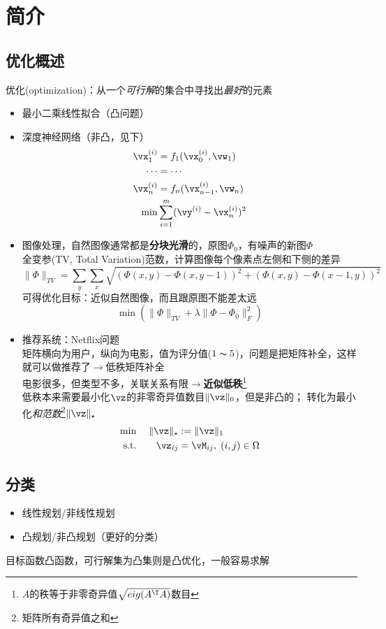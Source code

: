 
\section{简介} %
\subsection{优化概述}
优化(optimization)：从一个\emph{可行解}的集合中寻找出\emph{最好}的元素
\begin{example}
\begin{itemize}
\item 最小二乘线性拟合（凸问题）
\item 深度神经网络（非凸，见下）
\[\begin{aligned}
\vx_1^{(i)}&=f_1(\vx_0^{(i)},\vw_1)\\
\cdots&=\cdots\\
\vx_n^{(i)}&=f_n(\vx_{n-1}^{(i)},\vw_n)\\
\min&\sum_{i=1}^m(\vy^{(i)}-\vx_n^{(i)})^2
\end{aligned}\]
\item 图像处理，自然图像通常都是\textbf{分块光滑}的，原图$\Phi_0$，有噪声的新图$\Phi$\\
全变参(TV, Total Variation)范数，计算图像每个像素点左侧和下侧的差异
\[\|\Phi\|_{TV}=\sum_y\sum_x\sqrt{(\Phi(x,y)-\Phi(x,y-1))^2+(\Phi(x,y)-\Phi(x-1,y))^2}\]
可得优化目标：近似自然图像，而且跟原图不能差太远
\[\min(\|\Phi\|_{TV}+\lambda\|\Phi-\Phi_0\|_F^2)\]
\item 推荐系统：Netflix问题\\
矩阵横向为用户，纵向为电影，值为评分值($1\thicksim 5$)，问题是把矩阵补全，这样就可以做推荐了$\to$低秩矩阵补全\\
电影很多，但类型不多，关联关系有限$\to$\textbf{近似低秩}\footnote{$A$的秩等于非零奇异值$\sqrt{\mathop{eig}(A^\T A)}$数目}\\
低秩本来需要最小化$\vz$的非零奇异值数目$\|\vz\|_0$，但是非凸的；
转化为最小化\emph{和范数}\footnote{矩阵所有奇异值之和}$\|\vz\|_\star$
\[\begin{aligned}
\min& \;&\|\vz\|_\star&:=\|\vz\|_1\\
\text{s.t.}& \;&\vz_{ij}&=\vM_{ij},\;(i,j)\in\Omega
\end{aligned}\]
\end{itemize}
\end{example}

\subsection{分类}
\begin{itemize}
	\item 线性规划/非线性规划
	\item 凸规划/非凸规划（更好的分类）
\end{itemize}
目标函数凸函数，可行解集为凸集则是凸优化，一般容易求解

